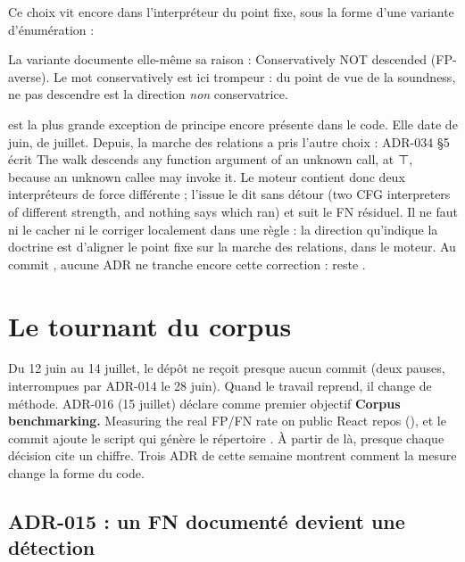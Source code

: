 Ce choix vit encore dans l'interpréteur du point fixe, sous la forme d'une variante d'énumération :


La variante  documente elle-même sa raison : \og Conservatively NOT descended (FP-averse)\fg{}. Le mot \og conservatively\fg{} est ici trompeur : du point de vue de la soundness, ne pas descendre est la direction \emph{non} conservatrice.

\begin{piege}
 est la plus grande exception de principe encore présente dans le code. Elle date de juin,  de juillet. Depuis, la marche des relations a pris l'autre choix : ADR-034 §5 écrit \og The walk descends any function argument of an unknown call, at ⊤, because an unknown callee may invoke it\fg{}. Le moteur contient donc deux interpréteurs de force différente ; l'issue  le dit sans détour (\og two CFG interpreters of different strength, and nothing says which ran\fg{}) et  suit le FN résiduel. Il ne faut ni le cacher ni le \og corriger\fg{} localement dans une règle : la direction qu'indique la doctrine est d'aligner le point fixe sur la marche des relations, dans le moteur. Au commit , aucune ADR ne tranche encore cette correction :  reste .
\end{piege}

\section{Le tournant du corpus}
\label{sec:histoire-doctrine-corpus}

Du 12 juin au 14 juillet, le dépôt ne reçoit presque aucun commit (deux pauses, interrompues par ADR-014 le 28 juin). Quand le travail reprend, il change de méthode. ADR-016 (15 juillet) déclare comme premier objectif \og \textbf{Corpus benchmarking.} Measuring the real FP/FN rate on public React repos\fg{} (), et le commit  ajoute le script qui génère le répertoire . À partir de là, presque chaque décision cite un chiffre. Trois ADR de cette semaine montrent comment la mesure change la forme du code.

\subsection{ADR-015 : un FN documenté devient une détection}


